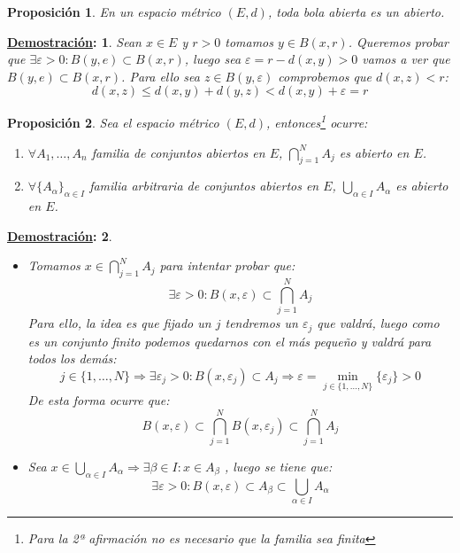\documentclass[10pt,a4paper,openright]{book}
\theoremstyle{break}
\newtheorem*{prop}{Proposición}
\newtheorem*{demo}{\underline{Demostración}:}
\begin{document}
\begin{prop}
En un espacio métrico $(E,d)$, toda bola abierta es un abierto.
\end{prop}

\begin{demo}
Sean $x \in E$ y $r>0$ tomamos $y \in B(x,r)$. Queremos probar que $\exists \varepsilon > 0 : B(y,e) \subset B(x,r)$, luego sea $\varepsilon = r - d(x,y) > 0$ vamos a ver que $B(y,e) \subset B(x,r)$. Para ello sea $z \in B(y, \varepsilon)$ comprobemos que $d(x,z) < r$:
$$d(x,z) \leq d(x,y) + d(y,z) < d(x,y) + \varepsilon = r$$
\end{demo}

\begin{prop}
Sea el espacio métrico $(E,d)$, entonces\footnote{Para la 2ª afirmación no es necesario que la familia sea finita} ocurre:
\begin{enumerate}
\item $\forall A_1, \ldots, A_n$ familia de conjuntos abiertos en $E$, $\displaystyle\bigcap_{j=1}^N A_j$ es abierto en $E$.

\item $\forall \{A_\alpha\}_{\alpha \in I}$ familia arbitraria de conjuntos abiertos en $E$, $\displaystyle \bigcup_{\alpha \in I} A_\alpha$ es abierto en $E$.
\end{enumerate}
\end{prop}

\begin{demo}
\begin{itemize}
\item Tomamos $x \in \displaystyle\bigcap_{j=1}^N A_j$ para intentar probar que:
$$\exists \varepsilon > 0 : B(x,\varepsilon) \subset \bigcap_{j=1}^N A_j$$
Para ello, la idea es que fijado un $j$ tendremos un $\varepsilon_j$ que valdrá, luego como es un conjunto finito podemos quedarnos con el más pequeño y valdrá para todos los demás:
$$j \in \{1, \ldots , N\} \Rightarrow \exists \varepsilon_j > 0 : B(x,\varepsilon_j) \subset A_j \Rightarrow \varepsilon = \underset{j \in \{1, \ldots , N\}}{\min}\{\varepsilon_j\} > 0$$
De esta forma ocurre que:
$$B(x,\varepsilon) \subset \bigcap_{j=1}^N B(x,\varepsilon_j)\subset  \bigcap_{j=1}^N A_j$$
\item Sea $x \in \displaystyle\bigcup_{\alpha \in I} A_\alpha \Rightarrow \exists \beta \in I : x \in A_\beta $ , luego se tiene que:
$$\exists \varepsilon > 0 : B(x, \varepsilon) \subset A_\beta \subset \bigcup_{\alpha \in I} A_\alpha$$
\end{itemize}
\end{demo}
\end{document}
